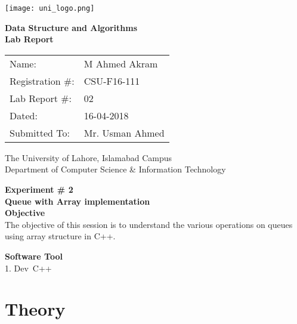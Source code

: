 \documentclass[11pt]{article}            %
\begin{document}
\begin{titlepage}
    \centering
  \vfill
    \texttt{[image: uni\_logo.png]} \\ 
	\vskip2cm
    {\bfseries\Large
	Data Structure and Algorithms \\ 
	
	\vskip2cm
	Lab Report 
	 
	\vskip2cm
	}    

\begin{center}
\begin{tabular}{ l l  } 

Name: & M Ahmed Akram \\ 
Registration \#: & CSU-F16-111 \\ 
Lab Report \#: & 02 \\ 
 Dated:& 16-04-2018\\ 
Submitted To:& Mr. Usman Ahmed\\ 

\end{tabular}
\end{center}
    \vfill
    The University of Lahore, Islamabad Campus\\
Department of Computer Science \& Information Technology
\end{titlepage}


    
    {\bfseries\Large
\centering
	Experiment \# 2 \\

Queue with Array implementation  \\
	
	}    
 \vskip1cm
 \textbf {Objective}\\  The objective of this session is to understand the various operations on queues using array structure in C++. 
 
 \textbf {Software Tool} \\
1.   Dev\ C++


\section{Theory }              
\end{document}
